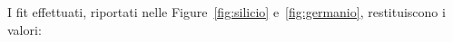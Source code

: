 \documentclass[@SRC@/main]{subfiles}
\begin{document}
    \noindent I fit effettuati, riportati nelle Figure~\ref{fig:silicio} e~\ref{fig:germanio}, restituiscono i valori:
\vspace{0.2cm}
\end{document}
